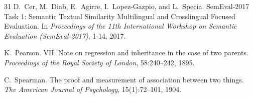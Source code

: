 \begin{thebibliography}{31}
D.~Cer, M.~Diab, E.~Agirre, I.~Lopez-Gazpio, and L.~Specia.
SemEval-2017 Task 1: Semantic Textual Similarity Multilingual and Crosslingual Focused Evaluation.
In \emph{Proceedings of the 11th International Workshop on Semantic Evaluation (SemEval-2017)}, 1-14, 2017.

K.~Pearson.
VII. Note on regression and inheritance in the case of two parents.
\emph{Proceedings of the Royal Society of London}, 58:240--242, 1895.

C.~Spearman.
The proof and measurement of association between two things.
\emph{The American Journal of Psychology}, 15(1):72--101, 1904.

\end{thebibliography}
